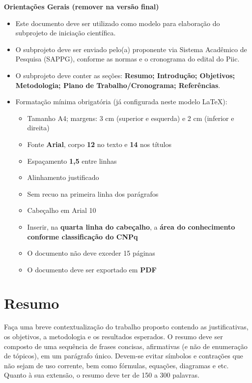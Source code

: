 \documentclass[12pt, a4paper]{article}
\begin{document}
{\color{Red} 
{\bf Orientações Gerais (remover na versão final)}
\begin{itemize}
	\item Este documento deve ser utilizado como modelo para elaboração do subprojeto de iniciação científica.
	\item O subprojeto deve ser enviado pelo(a) proponente via Sistema Acadêmico de Pesquisa (SAPPG), conforme as normas e o cronograma do edital do Piic.
	\item O subprojeto deve conter as seções: {\bf Resumo; Introdução; Objetivos; Metodologia; Plano de Trabalho/Cronograma; Referências}.
	\item Formatação mínima obrigatória (já configurada neste modelo \LaTeX):
	\begin{itemize}
		\item Tamanho A4; margens: 3 cm (superior e esquerda) e 2 cm (inferior e direita)
		\item Fonte \textbf{Arial}, corpo \textbf{12} no texto e \textbf{14} nos títulos
		\item Espaçamento \textbf{1,5} entre linhas
		\item Alinhamento justificado
		\item Sem recuo na primeira linha dos parágrafos
		\item Cabeçalho em Arial 10
		\item Inserir, na \textbf{quarta linha do cabeçalho}, a \textbf{área do conhecimento conforme classificação do CNPq}
		\item O documento não deve exceder 15 páginas
		\item O documento deve ser exportado em \textbf{PDF}
	\end{itemize}
\end{itemize}
}



\section*{Resumo}

Faça uma breve contextualização do trabalho proposto contendo as justificativas, os objetivos, a metodologia e os resultados esperados. O resumo deve ser composto de uma sequência de frases concisas, afirmativas (e não de enumeração de tópicos), em um parágrafo único. Devem-se evitar símbolos e contrações que não sejam de uso corrente, bem como fórmulas, equações, diagramas e etc. Quanto à sua extensão, o resumo deve ter de 150 a 300 palavras.
      
\end{document}
